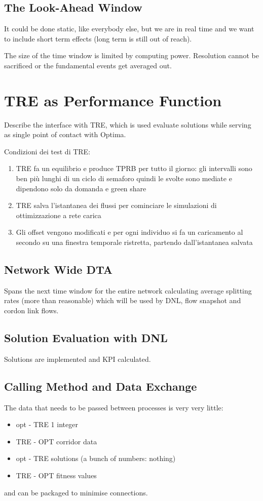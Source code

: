 \subsection{The Look-Ahead Window}
It could be done static, like everybody else, but we are in real time and we want to include short term effects (long term is still out of reach).

The size of the time window is limited by computing power. Resolution cannot be sacrificed or the fundamental events get averaged out.

\section{TRE as Performance Function}
Describe the interface with TRE, which is used evaluate solutions while serving as single point of contact with Optima.


Condizioni dei test di TRE:
\begin{enumerate}
\item TRE fa un equilibrio e produce TPRB per tutto il giorno: gli intervalli sono ben più lunghi di un ciclo di semaforo quindi le svolte sono mediate e dipendono solo da domanda e green share
\item TRE salva l'istantanea dei flussi per cominciare le simulazioni di ottimizzazione a rete carica
\item Gli offset vengono modificati e per ogni individuo si fa un caricamento al secondo su una finestra temporale ristretta, partendo dall'istantanea salvata
\end{enumerate}

\subsection{Network Wide DTA}
Spans the next time window for the entire network calculating average splitting rates (more than reasonable) which will be used by DNL, flow snapshot and cordon link flows.

\subsection{Solution Evaluation with DNL}
Solutions are implemented and KPI calculated.

\subsection{Calling Method and Data Exchange}
The data that needs to be passed between processes is very very little:
\begin{itemize}
\item opt - TRE 1 integer
\item TRE - OPT corridor data
\item opt - TRE solutions (a bunch of numbers: nothing)
\item TRE - OPT fitness values
\end{itemize}
and can be packaged to minimise connections.

